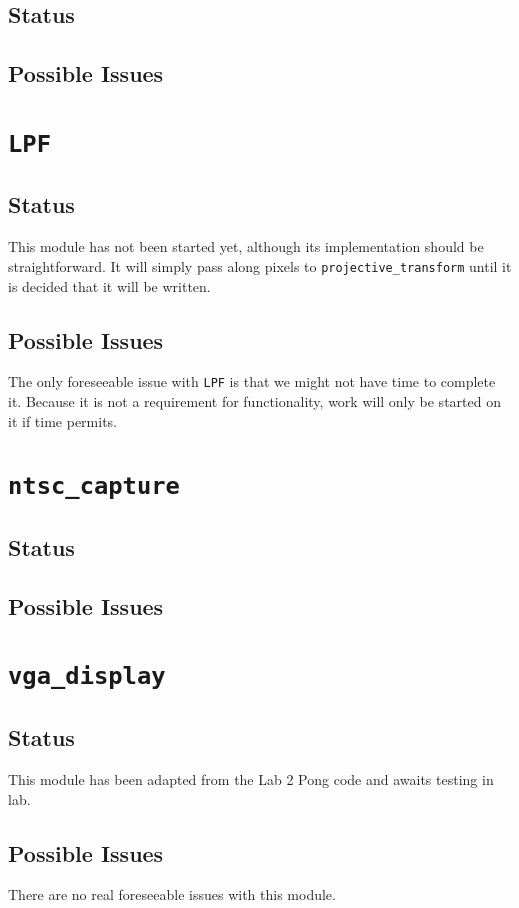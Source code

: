 \documentclass{article}
\begin{document}
\subsection{Status} 
\subsection{Possible Issues}

\section{{\tt LPF}}
\subsection{Status} This module has not been started yet, although its implementation should be straightforward. It will simply pass along pixels to {\tt projective\_transform} until it is decided that it will be written.
\subsection{Possible Issues} The only foreseeable issue with {\tt LPF} is that we might not have time to complete it. Because it is not a requirement for functionality, work will only be started on it if time permits.

\section{{\tt ntsc\_capture}}
\subsection{Status} 
\subsection{Possible Issues}

\section{{\tt vga\_display}}
\subsection{Status} This module has been adapted from the Lab 2 Pong code and awaits testing in lab.
\subsection{Possible Issues} There are no real foreseeable issues with this module.
\end{document}
